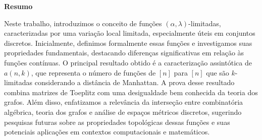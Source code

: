 \begin{center}
  \large \textbf{Resumo}
\end{center}
\vspace{1cm}
\par Neste trabalho, introduzimos o conceito de funções $(\alpha, \lambda)$-limitadas, caracterizadas por uma variação local limitada, especialmente úteis em conjuntos discretos. Inicialmente, definimos formalmente essas funções e investigamos suas propriedades fundamentais, destacando diferenças significativas em relação às funções contínuas. O principal resultado obtido é a caracterização assintótica de $a(n, k)$, que representa o número de funções de $[n]$ para $[n]$ que são $k$-limitadas considerando a distância de Manhattan. A prova desse resultado combina matrizes de Toeplitz com uma desigualdade bem conhecida da teoria dos grafos. Além disso, enfatizamos a relevância da interseção entre combinatória algébrica, teoria dos grafos e análise de espaços métricos discretos, sugerindo pesquisas futuras sobre as propriedades topológicas dessas funções e suas potenciais aplicações em contextos computacionais e matemáticos.

\vspace{1cm}

\begin{raggedleft}
\end{raggedleft}
